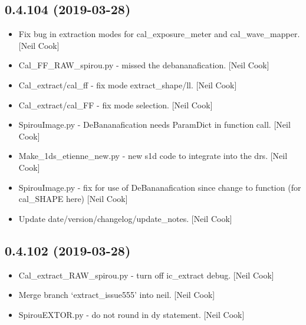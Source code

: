 \documentclass[a4paper,10pt,english]{report}
\begin{document}
\subsection{0.4.104 (2019-03-28)}
\label{\detokenize{misc/changelog:id154}}\begin{itemize}
\item {} 
Fix bug in extraction modes for cal\_exposure\_meter and
cal\_wave\_mapper. {[}Neil Cook{]}

\item {} 
Cal\_FF\_RAW\_spirou.py - missed the debananafication. {[}Neil Cook{]}

\item {} 
Cal\_extract/cal\_ff - fix mode extract\_shape/ll. {[}Neil Cook{]}

\item {} 
Cal\_extract/cal\_FF - fix mode selection. {[}Neil Cook{]}

\item {} 
SpirouImage.py - DeBananafication needs ParamDict in function call.
{[}Neil Cook{]}

\item {} 
Make\_1ds\_etienne\_new.py - new s1d code to integrate into the drs.
{[}Neil Cook{]}

\item {} 
SpirouImage.py - fix for use of DeBananafication since change to
function (for cal\_SHAPE here) {[}Neil Cook{]}

\item {} 
Update date/version/changelog/update\_notes. {[}Neil Cook{]}

\end{itemize}


\subsection{0.4.102 (2019-03-28)}
\label{\detokenize{misc/changelog:id155}}\begin{itemize}
\item {} 
Cal\_extract\_RAW\_spirou.py - turn off ic\_extract debug. {[}Neil Cook{]}

\item {} 
Merge branch ‘extract\_issue555’ into neil. {[}Neil Cook{]}

\item {} 
SpirouEXTOR.py - do not round in dy statement. {[}Neil Cook{]}

\end{itemize}
\end{document}
